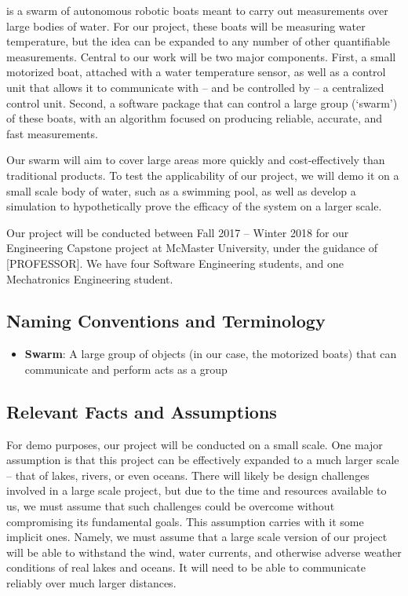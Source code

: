 \documentclass[11pt]{article}
\begin{document}
\PROJECTNAME \space is a swarm of autonomous robotic boats meant to carry out measurements over large bodies of water. For our project, these boats will be measuring water temperature, but the idea can be expanded to any number of other quantifiable measurements. Central to our work will be two major components. First, a small motorized boat, attached with a water temperature sensor, as well as a control unit that allows it to communicate with – and be controlled by – a centralized control unit. Second, a software package that can control a large group (‘swarm’) of these boats, with an algorithm focused on producing reliable, accurate, and fast measurements.

Our swarm will aim to cover large areas more quickly and cost-effectively than traditional products. To test the applicability of our project, we will demo it on a small scale body of water, such as a swimming pool, as well as develop a simulation to hypothetically prove the efficacy of the system on a larger scale.

Our project will be conducted between Fall 2017 – Winter 2018 for our Engineering Capstone project at McMaster University, under the guidance of [PROFESSOR]. We have four Software Engineering students, and one Mechatronics Engineering student.

\subsection{Naming Conventions and Terminology}

\label{sec:definitions}
\begin{itemize}
\item \textbf{Swarm}: A large group of objects (in our case, the motorized boats) that can communicate and perform acts as a group
\end{itemize}

\subsection{Relevant Facts and Assumptions}

For demo purposes, our project will be conducted on a small scale. One major assumption is that this project can be effectively expanded to a much larger scale – that of lakes, rivers, or even oceans. There will likely be design challenges involved in a large scale project, but due to the time and resources available to us, we must assume that such challenges could be overcome without compromising its fundamental goals. This assumption carries with it some  implicit ones. Namely, we must assume that a large scale version of our project will be able to withstand the wind, water currents, and otherwise adverse weather conditions of real lakes and oceans. It will need to be able to communicate reliably over much larger distances.
\end{document}
